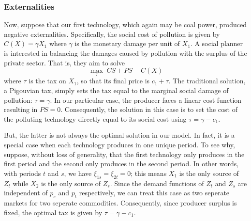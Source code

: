 \documentclass[12pt,a4paper]{extarticle}
\begin{document}
\subsubsection{Externalities}

Now, suppose that our first technology, which again may be coal power, produced negative externalities. Specifically, the social cost of pollution is given by $C(X) = \gamma X_1$ where $\gamma$ is the monetary damage per unit of $X_1$. A social planner is interested in balancing the damages caused by pollution with the surplus of the private sector. That is, they aim to solve
$$\max_{\tau} \; CS + PS - C(X)$$
where $\tau$ is the tax on $X_1$, so that its final price is $c_1 + \tau$. The traditional solution, a Pigouvian tax, simply sets the tax equal to the marginal social damage of pollution: $\tau = \gamma$. In our particular case, the producer faces a linear cost function resulting in $PS = 0$. Consequently, the solution in this case is to set the cost of the polluting technology directly equal to its social cost using $\tau = \gamma - c_1$. 

But, the latter is not always the optimal solution in our model. In fact, it is a special case when each technology produces in one unique period. To see why, suppose, without loss of generality, that the first technology only produces in the first period and the second only produces in the second period. In other words, with periods $t$ and $s$, we have $\xi_{1s} = \xi_{2t} = 0$; this means $X_1$ is the only source of $Z_t$ while $X_2$  is the only source of $Z_s$. Since the demand functions of $Z_t$ and $Z_s$ are independent of $p_s$ and $p_t$ respectively, we can treat this case as two seperate markets for two seperate commodities. Consequently, since producer surplus is fixed, the optimal tax is given by $\tau = \gamma - c_1$. 
\end{document}
